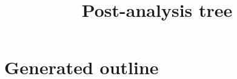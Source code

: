 \documentclass{article}
\title{Post-analysis tree}
\begin{document}
\maketitle

\section{Generated outline}

\end{document}
